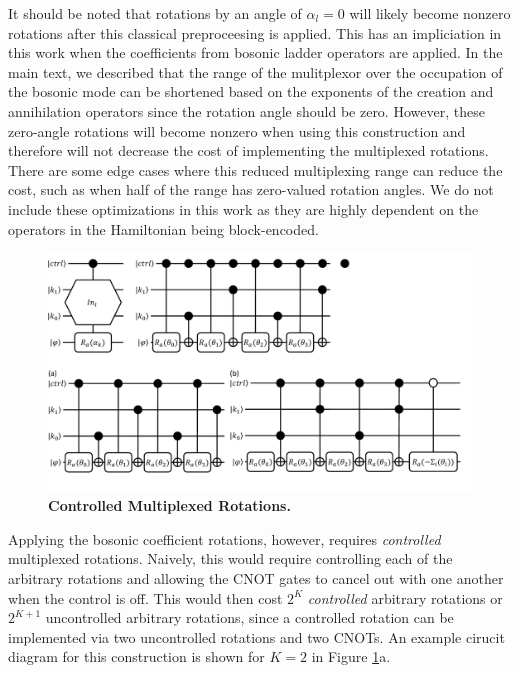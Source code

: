 It should be noted that rotations by an angle of $\alpha_l = 0$ will likely become nonzero rotations after this classical preproceesing is applied.
This has an impliciation in this work when the coefficients from bosonic ladder operators are applied.
In the main text, we described that the range of the mulitplexor over the occupation of the bosonic mode can be shortened based on the exponents of the creation and annihilation operators since the rotation angle should be zero.
However, these zero-angle rotations will become nonzero when using this construction and therefore will not decrease the cost of implementing the multiplexed rotations.
There are some edge cases where this reduced multiplexing range can reduce the cost, such as when half of the range has zero-valued rotation angles.
We do not include these optimizations in this work as they are highly dependent on the operators in the Hamiltonian being block-encoded.

\begin{figure}
    \centering
    \includegraphics[width=16cm]{figures/controlled-multiplexed-rotations.pdf}
    \caption{
        \textbf{Controlled Multiplexed Rotations.} 
    }
    \label{fig:controlled-multiplexed-rotations}
\end{figure}

Applying the bosonic coefficient rotations, however, requires \textit{controlled} multiplexed rotations.
Naively, this would require controlling each of the arbitrary rotations and allowing the CNOT gates to cancel out with one another when the control is off.
This would then cost $2^K$ \textit{controlled} arbitrary rotations or $2^{K+1}$ uncontrolled arbitrary rotations, since a controlled rotation can be implemented via two uncontrolled rotations and two CNOTs.
An example cirucit diagram for this construction is shown for $K = 2$ in Figure \ref{fig:controlled-multiplexed-rotations}a.

